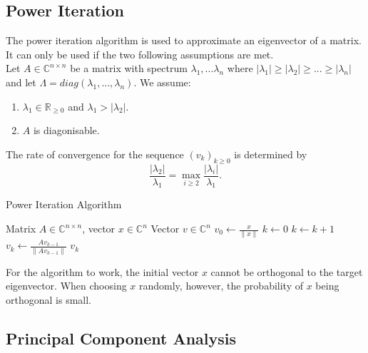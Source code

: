\documentclass[english]{panikzettel}
\begin{document}
\subsection{Power Iteration}
\begin{halfboxl}
\vspace{-\baselineskip}
  The power iteration algorithm is used to approximate an eigenvector of a matrix. It can only be used if the two following assumptions are met.\\
  Let $A\in\mathbb{C}^{n\times n}$ be a matrix with spectrum $\lambda_1,...\lambda_n$ where $|\lambda_1|\geq |\lambda_2|\geq ... \geq |\lambda_n|$ and let $\Lambda = diag(\lambda_1,...,\lambda_n)$. We assume:
  \begin{enumerate}
  \item $\lambda_1\in\mathbb{R}_{\geq 0}$ and $\lambda_1 > |\lambda_2|$.
  \item $A$ is diagonisable.
  \end{enumerate}

	The rate of convergence for the sequence $(v_k)_{k\geq 0}$ is determined by
	\[
	\frac{|\lambda_2|}{\lambda_1}=\max_{i\geq 2}\frac{|\lambda_i|}{\lambda_1}.
	\]
\end{halfboxl}
\begin{halfboxr}
\vspace{-\baselineskip}
\begin{algo}{Power Iteration Algorithm}
{
\renewcommand{\algorithmicrequire}{\textbf{Input:}}%
\renewcommand{\algorithmicensure}{\textbf{Output:}}%
  \begin{algorithmic}[1]
  \Require Matrix $A\in\mathbb{C}^{n\times n}$, vector $x\in\mathbb{C}^n$
  \Ensure Vector $v\in\mathbb{C}^n$
  \State $v_0\leftarrow\frac{x}{\parallel x \parallel}$
  \State $k\leftarrow 0$
  \Repeat
    \State $k\leftarrow k+1$
    \State $v_k\leftarrow \frac{Av_{k-1}}{\parallel Av_{k-1} \parallel}$
  \State \Return $v_k$
  \end{algorithmic}
}
\end{algo}
\end{halfboxr}
For the algorithm to work, the initial vector $x$ cannot be orthogonal to the target eigenvector.
When choosing $x$ randomly, however, the probability of $x$ being orthogonal is small.


\subsection{Principal Component Analysis}
\end{document}
